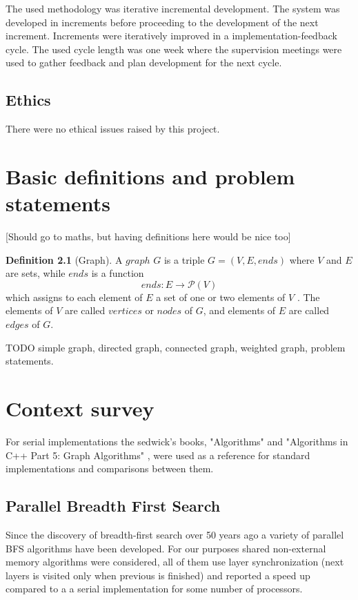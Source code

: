 \documentclass{report}
\theoremstyle{plain}
\theoremstyle{definition}
\newtheorem{definition}{Definition}
\theoremstyle{remark}
\begin{document}
The used methodology was iterative incremental development. The system was developed in increments before proceeding to the development of the next increment. Increments were iteratively improved in a implementation-feedback cycle. The used cycle length was one week where the supervision meetings were used to gather feedback and plan development for the next cycle. 

\section{Ethics}

There were no ethical issues raised by this project.

\chapter{Basic definitions and problem statements}

[Should go to maths, but having definitions here would be nice too]

\begin{definition}[Graph]
A $graph$  $G$ is a triple $G = (V, E, ends)$ where $V$ and $E$ are sets, while $ends$ is a function 
  \begin{equation}
  ends:E\to \mathcal P \left({V}\right)
  \end{equation}
which assigns to each element of $E$ a set of one or two elements of $V$ . The elements of $V$ are called $vertices$ or $nodes$ of $G$, and elements of $E$ are called $edges$ of $G$.
\end{definition}

TODO simple graph, directed graph, connected graph, weighted graph, problem statements. 

\chapter{Context survey}

For serial implementations the sedwick's books, "Algorithms" \cite{algo_sedgewick} and "Algorithms in C++ Part 5: Graph Algorithms" \cite{c++_sedgewick}, were used as a reference for standard implementations and comparisons between them.

\section{Parallel Breadth First Search}

Since the discovery of breadth-first search over 50 years ago a variety of parallel BFS algorithms have been developed. For our purposes shared non-external memory algorithms \cite{Leiserson, bader2006designing, cong2008solving, zhang2006parallel} were considered, all of them use layer synchronization (next layers is visited only when previous is finished) and reported a speed up compared to a a serial implementation for some number of processors.
\end{document}
